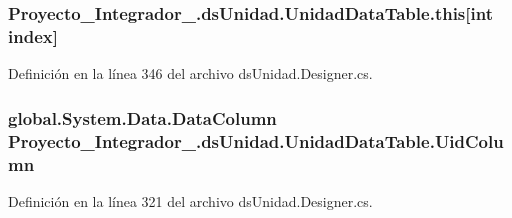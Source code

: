 \hypertarget{class_proyecto___integrador__3_1_1ds_unidad_1_1_unidad_data_table_addb75c1820ba9a4ab07cbdb53f137101}{
\subsubsection[{this[int index]}]{ Proyecto\-\_\-\-Integrador\-\_.\-ds\-Unidad.\-Unidad\-Data\-Table.\-this\mbox{[}int index\mbox{]}\hspace{0.3cm}{\ttfamily [get]}}}\label{class_proyecto___integrador__3_1_1ds_unidad_1_1_unidad_data_table_addb75c1820ba9a4ab07cbdb53f137101}


Definición en la línea 346 del archivo ds\-Unidad.\-Designer.\-cs.

\hypertarget{class_proyecto___integrador__3_1_1ds_unidad_1_1_unidad_data_table_a671279064b0207bdb3a67b438e9a01b8}{
\subsubsection[{Uid\-Column}]{\setlength{\rightskip}{0pt plus 5cm}global.\-System.\-Data.\-Data\-Column Proyecto\-\_\-\-Integrador\-\_.\-ds\-Unidad.\-Unidad\-Data\-Table.\-Uid\-Column\hspace{0.3cm}{\ttfamily [get]}}}\label{class_proyecto___integrador__3_1_1ds_unidad_1_1_unidad_data_table_a671279064b0207bdb3a67b438e9a01b8}


Definición en la línea 321 del archivo ds\-Unidad.\-Designer.\-cs.



